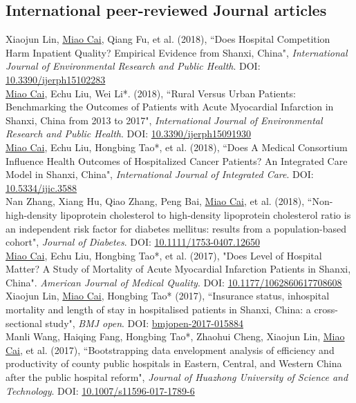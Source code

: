 \documentclass[11pt, a4paper]{article}
\newcommand{\years}[1]{\marginnote{\scriptsize #1}}
\begin{document}
\subsection*{International peer-reviewed Journal articles}
\noindent
\years{2018}Xiaojun Lin, \underline{Miao Cai}, Qiang Fu, et al. (2018), “Does Hospital Competition Harm Inpatient Quality? Empirical Evidence from Shanxi, China", \emph{International Journal of Environmental Research and Public Health}. DOI: \href{https://doi.org/10.3390/ijerph15102283}{10.3390/ijerph15102283}\\
\years{2018}\underline{Miao Cai}, Echu Liu, Wei Li*. (2018), “Rural Versus Urban Patients: Benchmarking the Outcomes of Patients with Acute Myocardial Infarction in Shanxi, China from 2013 to 2017", \emph{International Journal of Environmental Research and Public Health}. DOI: \href{https://doi.org/10.3390/ijerph15091930}{10.3390/ijerph15091930}\\
\years{2018}\underline{Miao Cai}, Echu Liu, Hongbing Tao*, et al. (2018), “Does A Medical Consortium Influence Health Outcomes of Hospitalized Cancer Patients? An Integrated Care Model in Shanxi, China", \emph{International Journal of Integrated Care}. DOI: \href{https://doi.org/10.5334/ijic.3588}{10.5334/ijic.3588}\\
\years{2018}Nan Zhang, Xiang Hu, Qiao Zhang, Peng Bai, \underline{Miao Cai}, et al. (2018), “Non-high-density lipoprotein cholesterol to high-density lipoprotein cholesterol ratio is an independent risk factor for diabetes mellitus: results from a population-based cohort", \emph{Journal of Diabetes}. DOI: \href{https://doi.org/10.1111/1753-0407.12650}{10.1111/1753-0407.12650}\\
\years{2017}\underline{Miao Cai}, Echu Liu, Hongbing Tao*, et al. (2017), "Does Level of Hospital Matter? A Study of Mortality of Acute Myocardial Infarction Patients in Shanxi, China". \emph{American Journal of Medical Quality}. DOI: \href{https://doi.org/10.1177/1062860617708608}{10.1177/1062860617708608}\\
\years{2017}Xiaojun Lin, \underline{Miao Cai}, Hongbing Tao* (2017), “Insurance status, inhospital mortality and length of stay in hospitalised patients in Shanxi, China: a cross-sectional study", \emph{BMJ open}. DOI: \href{https://doi.org/10.1136/bmjopen-2017-015884}{bmjopen-2017-015884}\\
\years{2017}Manli Wang, Haiqing Fang, Hongbing Tao*, Zhaohui Cheng, Xiaojun Lin, \underline{Miao Cai}, et al. (2017), “Bootstrapping data envelopment analysis of efficiency and productivity of county public hospitals in Eastern, Central, and Western China after the public hospital reform", \emph{Journal of Huazhong University of Science and Technology}. DOI: \href{https://doi.org/10.1007/s11596-017-1789-6}{10.1007/s11596-017-1789-6}\\
\end{document}
